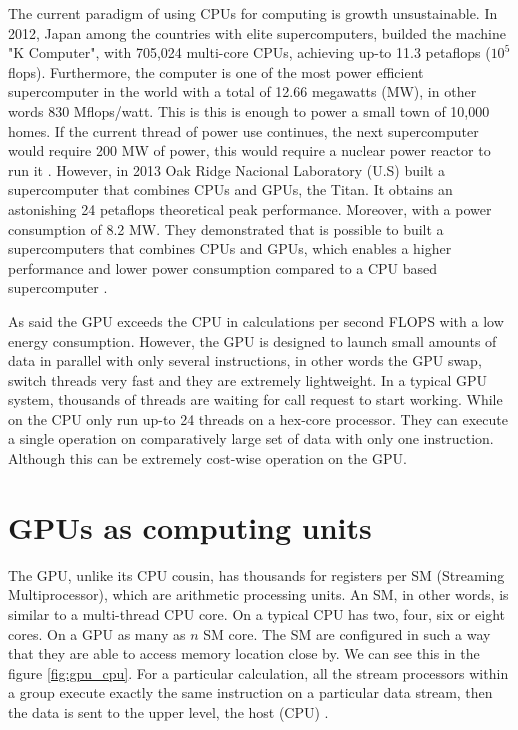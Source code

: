 The current paradigm of using CPUs for computing is growth unsustainable. In 2012, Japan among the countries with elite supercomputers, builded the machine "K Computer", with 705,024 multi-core CPUs, achieving up-to 11.3 petaflops ($10^5$ flops). Furthermore, the computer is one of the most power efficient supercomputer in the world with a total of 12.66 megawatts (MW), in other words 830 Mflops/watt. This is this is enough to power a small town of 10,000 homes. If the current thread of power use continues, the next supercomputer would require 200 MW of power, this would require a nuclear power reactor to run it \cite{whatexascale}. However, in 2013 Oak Ridge Nacional Laboratory (U.S) built a supercomputer that combines CPUs and GPUs, the Titan. It obtains an astonishing 24 petaflops theoretical peak performance. Moreover, with a power consumption of 8.2 MW. They demonstrated that is possible to built a supercomputers that combines CPUs and GPUs, which enables a  higher performance and lower power consumption compared to a CPU based supercomputer \cite{titan}.

As said the GPU exceeds the CPU in calculations per second FLOPS with a low energy consumption. However, the GPU is designed to launch small amounts of data in parallel with only several instructions, in other words the GPU swap, switch threads very fast and they are extremely lightweight. In a typical GPU system, thousands of threads are waiting for call request to start working. While on the CPU only run up-to 24 threads on a hex-core processor. They can execute a single operation on comparatively large set of data with only one instruction. Although this can be extremely cost-wise operation on the GPU.

\section{GPUs as computing units}


The GPU, unlike its CPU cousin, has thousands for registers per SM (Streaming Multiprocessor), which are arithmetic processing units. An SM, in other words, is similar to a multi-thread CPU core. On a typical CPU has two, four, six or eight cores. On a GPU as many as $n$ SM core. The SM are configured in such a way that they are able to access memory location close by. We can see this in the figure \ref{fig:gpu_cpu}. For a particular calculation, all the stream processors within a group execute exactly the same instruction on a particular data stream, then the data is sent to the upper level, the host (CPU) \cite{cook}.


